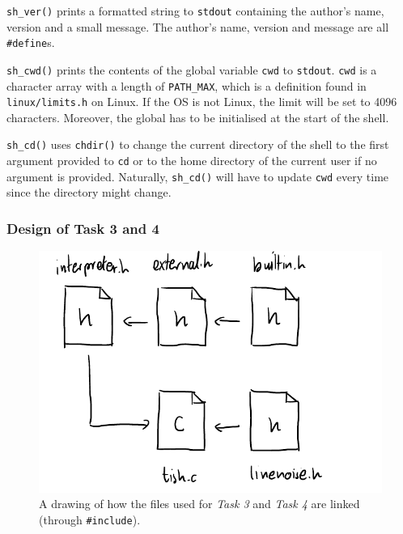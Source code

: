 \documentclass[12pt]{article}
\begin{document}
\texttt{sh\_ver()} prints a formatted string to \texttt{stdout}
containing the author's name, version and a small message. The
author's name, version and message are all \texttt{\#define}s.





\texttt{sh\_cwd()} prints the contents of the global variable
\texttt{cwd} to \texttt{stdout}. \texttt{cwd} is a character
array with a length of \texttt{PATH\_MAX}, which is a definition
found in \texttt{linux/limits.h} on Linux. If the OS is not
Linux, the limit will be set to 4096 characters. Moreover, the
global has to be initialised at the start of the shell.

\texttt{sh\_cd()} uses \texttt{chdir()} to change the current
directory of the shell to the first argument provided to
\texttt{cd} or to the home directory of the current user if no
argument is provided. Naturally, \texttt{sh\_cd()} will have to
update \texttt{cwd} every time since the directory might change.

\subsubsection{Design of Task 3 and 4}

\begin{figure}[H]
\centering
\includegraphics{task3arch}
\caption{A drawing of how the files used for \textit{Task 3} and
\textit{Task 4} are linked (through \texttt{\#include}).}
\end{figure}
\end{document}

